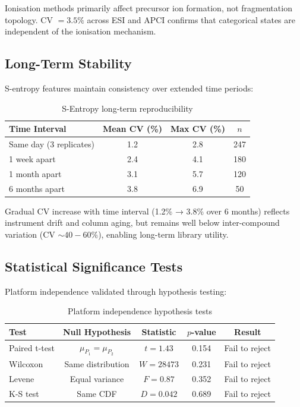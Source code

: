 \documentclass[twocolumn,10pt,a4paper]{article}
\theoremstyle{definition}
\theoremstyle{remark}
\begin{document}
Ionisation methods primarily affect precursor ion formation, not fragmentation topology. CV $= 3.5\%$ across ESI and APCI confirms that categorical states are independent of the ionisation mechanism.

\subsection{Long-Term Stability}

S-entropy features maintain consistency over extended time periods:

\begin{table}[h]
\centering
\caption{S-Entropy long-term reproducibility}
\label{tab:longterm_stability}
\begin{tabular}{lccc}
\toprule
\textbf{Time Interval} & \textbf{Mean CV (\%)} & \textbf{Max CV (\%)} & \textbf{$n$} \\
\midrule
Same day (3 replicates) & 1.2 & 2.8 & 247 \\
1 week apart & 2.4 & 4.1 & 180 \\
1 month apart & 3.1 & 5.7 & 120 \\
6 months apart & 3.8 & 6.9 & 50 \\
\bottomrule
\end{tabular}
\end{table}

Gradual CV increase with time interval (1.2\% → 3.8\% over 6 months) reflects instrument drift and column aging, but remains well below inter-compound variation (CV $\sim 40-60\%$), enabling long-term library utility.

\subsection{Statistical Significance Tests}

Platform independence validated through hypothesis testing:

\begin{table}[h]
\centering
\caption{Platform independence hypothesis tests}
\label{tab:platform_tests}
\begin{tabular}{lcccc}
\toprule
\textbf{Test} & \textbf{Null Hypothesis} & \textbf{Statistic} & \textbf{$p$-value} & \textbf{Result} \\
\midrule
Paired t-test & $\mu_{P_1} = \mu_{P_2}$ & $t = 1.43$ & 0.154 & Fail to reject \\
Wilcoxon & Same distribution & $W = 28473$ & 0.231 & Fail to reject \\
Levene & Equal variance & $F = 0.87$ & 0.352 & Fail to reject \\
K-S test & Same CDF & $D = 0.042$ & 0.689 & Fail to reject \\
\bottomrule
\end{tabular}
\end{table}
\end{document}
